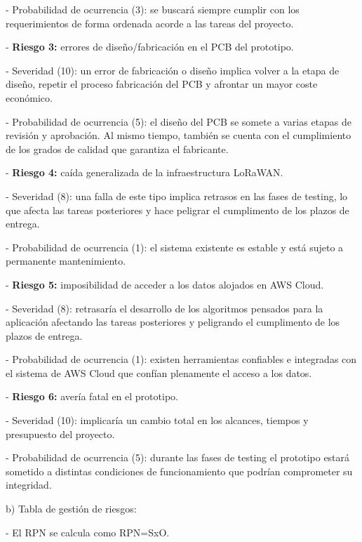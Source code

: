 \documentclass[11pt]{charter}
\begin{document}
	- Probabilidad de ocurrencia (3): se buscará siempre cumplir con los requerimientos de forma ordenada acorde a las tareas del proyecto.  
	
- \textbf{Riesgo 3:} errores de diseño/fabricación en el PCB del prototipo.
	
	- Severidad (10): un error de fabricación o diseño implica volver a la etapa de diseño, repetir el proceso fabricación del PCB y afrontar un mayor coste económico. 
	
	- Probabilidad de ocurrencia (5): el diseño del PCB se somete a varias etapas de revisión y aprobación. Al mismo tiempo, también se cuenta con el cumplimiento de los grados de calidad que garantiza el fabricante.  
	
- \textbf{Riesgo 4:} caída generalizada de la infraestructura LoRaWAN.
	
	- Severidad (8): una falla de este tipo implica retrasos en las fases de testing, lo que afecta las tareas posteriores y hace peligrar el cumplimento de los plazos de entrega. 
	
	- Probabilidad de ocurrencia (1): el sistema existente es estable y está sujeto a permanente mantenimiento. 
	
- \textbf{Riesgo 5:} imposibilidad de acceder a los datos alojados en AWS Cloud. 
	
	- Severidad (8): retrasaría el desarrollo de los algoritmos pensados para la aplicación afectando las tareas posteriores y peligrando el cumplimento de los plazos de entrega. 
	
	- Probabilidad de ocurrencia (1): existen herramientas confiables e integradas con el sistema de AWS Cloud que confían plenamente el acceso a los datos. 

- \textbf{Riesgo 6:} avería fatal en el prototipo.
	
	- Severidad (10): implicaría un cambio total en los alcances, tiempos y presupuesto del proyecto. 
	
	- Probabilidad de ocurrencia (5): durante las fases de testing el prototipo estará sometido a distintas condiciones de funcionamiento que podrían comprometer su integridad. 

b) Tabla de gestión de riesgos:

- El RPN se calcula como RPN=SxO.
\end{document}
